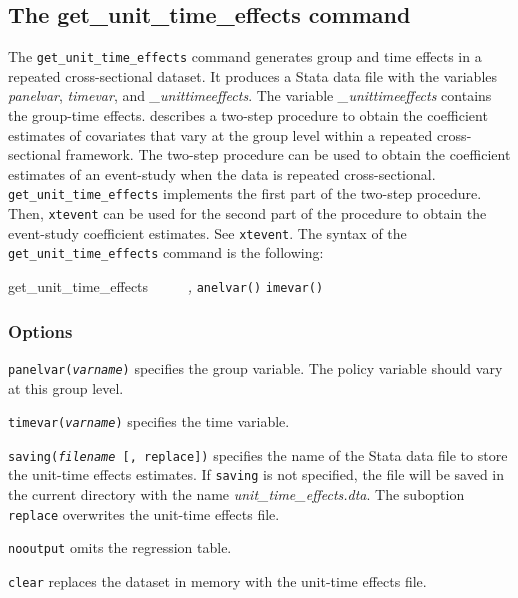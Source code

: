 \documentclass[bib]{./sty/statapress}
\begin{document}
\subsection{The get\_unit\_time\_effects command}
The \texttt{get\_unit\_time\_effects} command generates group and time effects in a repeated cross-sectional dataset. It produces a Stata data file with the variables {\it panelvar}, {\it timevar}, and {\it \_unittimeeffects}. The variable {\it \_unittimeeffects} contains the group-time effects.
 \citet{hansen2007generalized} describes a two-step procedure to obtain the coefficient estimates of covariates that vary at the group level within a repeated cross-sectional framework. The two-step procedure can be used to obtain the coefficient estimates of an event-study when the data is repeated cross-sectional. \texttt{get\_unit\_time\_effects} implements the first part of the two-step procedure. Then, \texttt{xtevent} can be used for the second part of the procedure to obtain the event-study coefficient estimates. See \texttt{xtevent}. The syntax of the \texttt{get\_unit\_time\_effects} command is the following:

\begin{stsyntax}
get\_unit\_time\_effects
    \depvar\
    \optindepvars\
    \optif\
    \optin\
    \optweight\
    \emph{,}
    \texttt{anelvar(\varname)}
    \texttt{imevar(\varname)}\
\end{stsyntax}

\subsubsection{Options}
\hangpara
\texttt{panelvar({\it varname})} specifies the group variable. The policy variable should vary at this group level.

\hangpara
\texttt{timevar({\it varname})} specifies the time variable.

\hangpara
\texttt{saving({\it filename} [, replace])} specifies the name of the Stata data file to store the unit-time effects estimates. If \texttt{saving} is not specified, the file will be saved in the current directory with the name {\it unit\_time\_effects.dta}. The suboption \texttt{replace} overwrites the unit-time effects file.

\hangpara
\texttt{nooutput} omits the regression table.

\hangpara
\texttt{clear} replaces the dataset in memory with the unit-time effects file.
\end{document}
